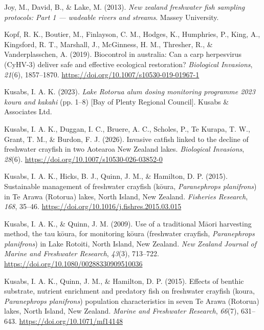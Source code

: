 \documentclass[
  letterpaper,
  DIV=11,
  numbers=noendperiod]{scrartcl}
\newlength{\cslhangindent}
\newenvironment{CSLReferences}[2] %
 {\begin{list}{}{%
  \setlength{\itemindent}{0pt}
  \setlength{\leftmargin}{0pt}
  \setlength{\parsep}{0pt}
  \ifodd #1
   \setlength{\leftmargin}{\cslhangindent}
   \setlength{\itemindent}{-1\cslhangindent}
  \fi
  \setlength{\itemsep}{#2\baselineskip}}}
 {\end{list}}
\begin{document}
\begin{CSLReferences}{1}{0}
Joy, M., David, B., \& Lake, M. (2013). \emph{New zealand freshwater
fish sampling protocols: Part 1 --- wadeable rivers and streams}. Massey
University.

Kopf, R. K., Boutier, M., Finlayson, C. M., Hodges, K., Humphries, P.,
King, A., Kingsford, R. T., Marshall, J., McGinness, H. M., Thresher,
R., \& Vanderplasschen, A. (2019). Biocontrol in australia: Can a carp
herpesvirus (CyHV-3) deliver safe and effective ecological restoration?
\emph{Biological Invasions}, \emph{21}(6), 1857--1870.
\url{https://doi.org/10.1007/s10530-019-01967-1}

Kusabs, I. A. K. (2023). \emph{{Lake Rotorua} alum dosing monitoring
programme 2023 koura and kakahi} (pp. 1--8) {[}Bay of Plenty Regional
Council{]}. Kusabs \& Associates Ltd.

Kusabs, I. A. K., Duggan, I. C., Bruere, A. C., Scholes, P., Te Kurapa,
T. W., Grant, T. M., \& Burdon, F. J. (2026). Invasive catfish linked to
the decline of freshwater crayfish in two {Aotearoa New Zealand} lakes.
\emph{Biological Invasions}, \emph{28}(6).
\url{https://doi.org/10.1007/s10530-026-03852-0}

Kusabs, I. A. K., Hicks, B. J., Quinn, J. M., \& Hamilton, D. P. (2015).
Sustainable management of freshwater crayfish (kōura,
{\emph{Paranephrops planifrons}}) in {Te Arawa} ({Rotorua}) lakes,
{North Island}, {New Zealand}. \emph{Fisheries Research}, \emph{168},
35--46. \url{https://doi.org/10.1016/j.fishres.2015.03.015}

Kusabs, I. A. K., \& Quinn, J. M. (2009). Use of a traditional {Māori}
harvesting method, the tau k{ō}ura, for monitoring k{ō}ura (freshwater
crayfish, {\emph{Paranephrops planifrons}}) in {Lake Rotoiti}, {North
Island, New Zealand}. \emph{New Zealand Journal of Marine and Freshwater
Research}, \emph{43}(3), 713--722.
\url{https://doi.org/10.1080/00288330909510036}

Kusabs, I. A. K., Quinn, J. M., \& Hamilton, D. P. (2015). Effects of
benthic substrate, nutrient enrichment and predatory fish on freshwater
crayfish (koura, {\emph{Paranephrops planifrons}}) population
characteristics in seven {Te Arawa} ({Rotorua}) lakes, {North Island},
{New Zealand}. \emph{Marine and Freshwater Research}, \emph{66}(7),
631--643. \url{https://doi.org/10.1071/mf14148}


\end{CSLReferences}
\end{document}
